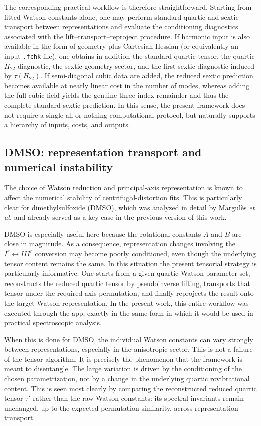 \documentclass[aip,jcp,reprint,floatfix]{revtex4-2}
\begin{document}
The corresponding practical workflow is therefore straightforward.
Starting from fitted Watson constants alone, one may perform standard
quartic and sextic transport between representations and evaluate the
conditioning diagnostics associated with the lift--transport--reproject
procedure. If harmonic input is also available in the form of geometry
plus Cartesian Hessian (or equivalently an input \texttt{.fchk} file),
one obtains in addition the standard quartic tensor, the quartic
$H_{22}$ diagnostic, the sextic geometry sector, and the first sextic
diagnostic induced by $\tau(H_{22})$. If semi-diagonal cubic data are
added, the reduced sextic prediction becomes available at nearly linear
cost in the number of modes, whereas adding the full cubic field yields
the genuine three-index remainder and thus the complete standard sextic
prediction. In this sense, the present framework does not require a
single all-or-nothing computational protocol, but naturally supports a
hierarchy of inputs, costs, and outputs.

\subsection{DMSO: representation transport and numerical instability}

The choice of Watson reduction and principal-axis representation is known to
affect the numerical stability of centrifugal-distortion fits. This is
particularly clear for dimethylsulfoxide (DMSO), which was analyzed in detail
by Margul\`es \emph{et al.}\cite{Margules2010} and already served as a key case
in the previous version of this work.

DMSO is especially useful here because the rotational constants $A$ and $B$
are close in magnitude. As a consequence, representation changes involving the
$I^r \leftrightarrow III^r$ conversion may become poorly conditioned, even
though the underlying tensor content remains the same. In this situation the
present tensorial strategy is particularly informative. One starts from a
given quartic Watson parameter set, reconstructs the reduced quartic tensor by
pseudoinverse lifting, transports that tensor under the required axis
permutation, and finally reprojects the result onto the target Watson
representation. In the present work, this entire workflow was executed through
the app, exactly in the same form in which it would be used in practical
spectroscopic analysis.

When this is done for DMSO, the individual Watson constants can vary strongly
between representations, especially in the anisotropic sector. This is not a
failure of the tensor algorithm. It is precisely the phenomenon that the
framework is meant to disentangle. The large variation is driven by the
conditioning of the chosen parametrization, not by a change in the underlying
quartic rovibrational content. This is seen most clearly by comparing the
reconstructed reduced quartic tensor $\tau'$ rather than the raw Watson
constants: its spectral invariants remain unchanged, up to the expected
permutation similarity, across representation transport.
\end{document}
